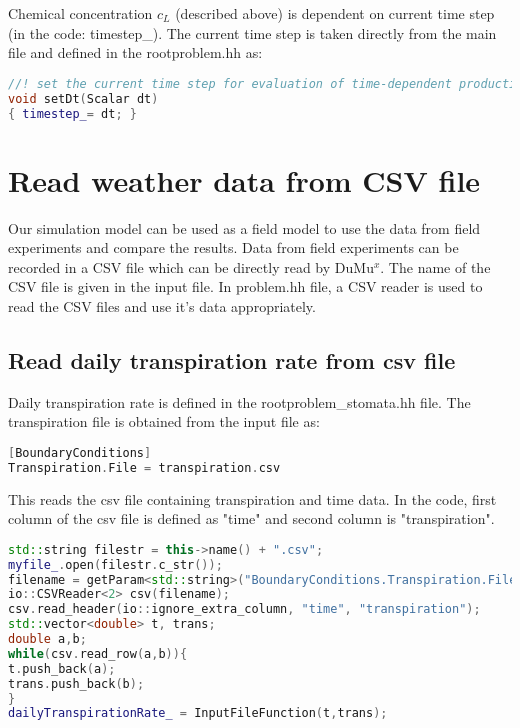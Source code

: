 Chemical concentration $c_L$ (described above) is dependent on current time step (in the code: timestep\_). The current time step is taken directly from the main file and defined in the rootproblem.hh as:

\begin{lstlisting}[language=C++, caption={current time step}]
//! set the current time step for evaluation of time-dependent production of chemical
void setDt(Scalar dt)
{ timestep_= dt; }
\end{lstlisting}  

\section*{Read weather data from CSV file}
Our simulation model can be used as a field model to use the data from field experiments and compare the results. Data from field experiments can be recorded in a CSV file which can be directly read by DuMu$^x$. The name of the CSV file is given in the input file. In problem.hh file, a CSV reader is used to read the CSV files and use it's data appropriately. 

\subsection*{Read daily transpiration rate from csv file}

Daily transpiration rate is defined in the rootproblem\_stomata.hh file. The transpiration file is obtained from the input file as:

\begin{lstlisting}[language=C++, caption={CSV file defined in input file}]
[BoundaryConditions]
Transpiration.File = transpiration.csv 
\end{lstlisting} 

This reads the csv file containing transpiration and time data. In the code, first column of the csv file is defined as "time" and second column is "transpiration". 

\begin{lstlisting}[language=C++, caption={Read daily transpiration rate from csv file}]
std::string filestr = this->name() + ".csv";
myfile_.open(filestr.c_str());
filename = getParam<std::string>("BoundaryConditions.Transpiration.File");
io::CSVReader<2> csv(filename);
csv.read_header(io::ignore_extra_column, "time", "transpiration");
std::vector<double> t, trans;
double a,b;
while(csv.read_row(a,b)){
t.push_back(a);
trans.push_back(b);
}
dailyTranspirationRate_ = InputFileFunction(t,trans);  
\end{lstlisting} 

